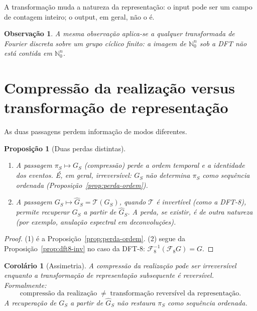 \documentclass[11pt,a4paper]{article}
\newtheorem{proposicao}{Proposição}
\newtheorem{observacao}{Observação}
\newtheorem{corolario}{Corolário}
\begin{document}
A transformação muda a natureza da representação: o input pode ser um campo de contagem inteiro; o output, em geral, não o é.

\begin{observacao}
A mesma observação aplica-se a qualquer transformada de Fourier discreta sobre um grupo cíclico finito: a imagem de \(\mathbb N_0^n\) sob a DFT não está contida em \(\mathbb N_0^n\).
\end{observacao}

\section{Compressão da realização versus transformação de representação}

As duas passagens perdem informação de modos diferentes.

\begin{proposicao}[Duas perdas distintas]
\label{prop:duas-perdas}
\begin{enumerate}[leftmargin=1.5em]
\item A passagem \(\pi_S\mapsto G_S\) (compressão) perde a ordem temporal e a identidade dos eventos. É, em geral, irreversível: \(G_S\) não determina \(\pi_S\) como sequência ordenada (Proposição~\ref{prop:perda-ordem}).
\item A passagem \(G_S\mapsto\widehat G_S=\mathcal T(G_S)\), quando \(\mathcal T\) é invertível (como a DFT-8), permite recuperar \(G_S\) a partir de \(\widehat G_S\). A perda, se existir, é de outra natureza (por exemplo, anulação espectral em deconvoluções).
\end{enumerate}
\end{proposicao}

\begin{proof}
(1) é a Proposição~\ref{prop:perda-ordem}. (2) segue da Proposição~\ref{prop:dft8-inv} no caso da DFT-8: \(\mathcal F_8^{-1}(\mathcal F_8 G)=G\).
\end{proof}

\begin{corolario}[Assimetria]
\label{cor:assimetria}
A compressão da realização pode ser irreversível enquanto a transformação de representação subsequente é reversível. Formalmente:
\[
\boxed{
\text{compressão da realização}
\;\neq\;
\text{transformação reversível da representação}.
}
\]
A recuperação de \(G_S\) a partir de \(\widehat G_S\) não restaura \(\pi_S\) como sequência ordenada.
\end{corolario}
\end{document}
